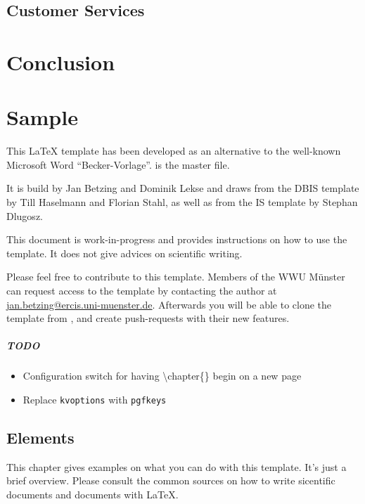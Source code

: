	\section{Customer Services}
\chapter{Conclusion}






\chapter{Sample}
This \LaTeX \- template has been developed as an alternative to the well-known Microsoft Word \enquote{Becker-Vorlage}.  is the master file.

It is build by  Jan Betzing and Dominik Lekse and draws from the DBIS template by Till Haselmann and Florian Stahl, as well as from the IS template by Stephan Dlugosz.

This document is work-in-progress and provides instructions on how to use the template. It does not give advices on scientific writing.

Please feel free to contribute to this template. Members of the WWU M\"{u}nster can request access to the template by contacting the author at \href{mailto:jan.betzing@ercis.uni-muenster.de}{jan.betzing@ercis.uni-muenster.de}. Afterwards you will be able to clone the template from , and create push-requests with their new features.

\paragraph{TODO}
\begin{itemize}
	\item Configuration switch for having \textbackslash chapter\{\} begin on a new page
	\item Replace \texttt{kvoptions} with \texttt{pgfkeys}
\end{itemize}
\section{Elements}
This chapter gives examples on what you can do with this template. It's just a brief overview. Please consult the common sources on how to write sicentific documents and documents with \LaTeX.

